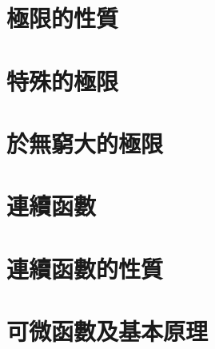 \documentclass[12pt]{article}
\begin{document}
    \section*{極限的性質}
    \section*{特殊的極限}
    \section*{於無窮大的極限}
    \section*{連續函數}
    \section*{連續函數的性質}
    \section*{可微函數及基本原理}
\end{document}
